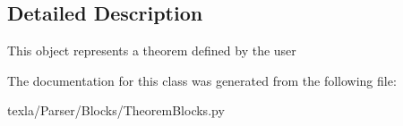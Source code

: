 \subsection{Detailed Description}
\begin{DoxyVerb}This object represents a theorem defined
by the user\end{DoxyVerb}
 

The documentation for this class was generated from the following file\+:\begin{DoxyCompactItemize}
\item 
texla/\+Parser/\+Blocks/Theorem\+Blocks.\+py\end{DoxyCompactItemize}
